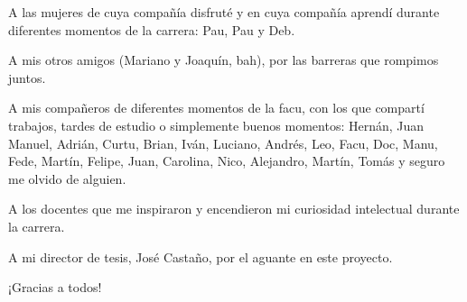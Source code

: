 \noindent A las mujeres de cuya compañía disfruté y en cuya compañía aprendí durante diferentes momentos de la carrera: Pau, Pau y Deb. \newline

\medskip

\noindent A mis otros amigos (Mariano y Joaquín, bah), por las barreras que rompimos juntos. \newline

\medskip

\noindent A mis compañeros de diferentes momentos de la facu, con los que compartí trabajos, tardes de estudio o simplemente buenos momentos: Hernán, Juan Manuel, Adrián, Curtu, Brian, Iván, Luciano, Andrés, Leo, Facu, Doc, Manu, Fede, Martín, Felipe, Juan, Carolina, Nico, Alejandro, Martín, Tomás y seguro me olvido de alguien. \newline

\noindent A los docentes que me inspiraron y encendieron mi curiosidad intelectual durante la carrera. \newline

\medskip

\noindent A mi director de tesis, José Castaño, por el aguante en este proyecto. \newline

\medskip

\begin{centering}
	¡Gracias a todos!
\end{centering}